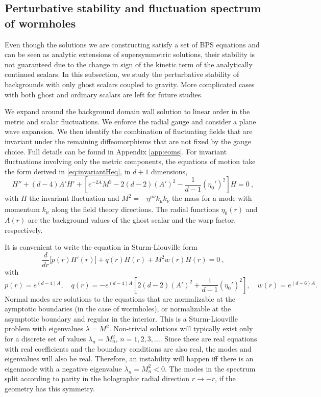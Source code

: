 \subsection{Perturbative stability and fluctuation spectrum of wormholes}

Even though the solutions we are constructing satisfy a set of BPS equations and can be seen as analytic extensions of supersymmetric solutions, their stability is not guaranteed due to the change in sign of the kinetic term of the analytically continued scalars. In this subsection, we study the perturbative stability of backgrounds with only ghost scalars coupled to gravity. More complicated cases with both ghost and ordinary scalars are left for future studies.

We expand around the background domain wall solution to linear order in the metric and scalar fluctuations. We enforce the radial gauge and consider a plane wave expansion. We then identify the combination of fluctuating fields that are invariant under the remaining diffeomorphisms that are not fixed by the gauge choice. Full details can be found in Appendix \ref{app:eoms}. For invariant fluctuations involving only the metric components, the equations of motion take the form derived in \eqref{eq:invariantHeq}, in $d+1$ dimensions,
\begin{equation}
	H''+(d-4)A' H'+\left[e^{-2A}M^2-2(d-2)(A')^2-\frac{1}{d-1}(\eta_0')^2\right]H=0\ ,
\end{equation}
with $H$ the invariant fluctuation and $M^2=-\eta^{\mu\nu}k_\mu k_\nu$ the mass for a mode with momentum $k_\mu$ along the field theory directions. The radial functions $\eta_0(r)$ and $A(r)$ are the background values of the ghost scalar and the warp factor, respectively. 

It is convenient to write the equation in Sturm-Liouville form
\begin{equation}
	\frac{d}{dr}\Big[p(r)H'(r)\Big]+q(r)H(r)+M^2 w(r) H(r)=0\ ,
\end{equation}
with
\begin{equation}
	p(r)=e^{(d-4)A}
	,\quad 
	q(r)=-e^{(d-4)A}\left[2(d-2)(A')^2+\frac{1}{d-1}(\eta_0')^2\right],\quad w(r)=e^{(d-6)A}.
\end{equation}
Normal modes are solutions to the equations that are normalizable at the aymptotic boundaries (in the case of wormholes), or normalizable at the asymptotic boundary and regular in the interior. This is a Sturm-Liouville problem with eigenvalues $\lambda=M^2$. Non-trivial solutions will typically exist only for a discrete set of values $\lambda_n=M_n^2$, $n=1,2,3,\dots$. Since these are real equations with real coefficients and the boundary conditions are also real, the modes and eigenvalues will also be real. Therefore, an instability will happen iff there is an eigenmode with a negative eigenvalue $\lambda_n=M_n^2<0$. The modes in the spectrum split according to parity in the holographic radial direction $r\to -r$, if the geometry has this symmetry.

